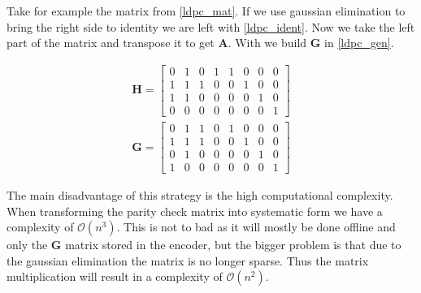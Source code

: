 Take for example the matrix from \cref{ldpc_mat}. If we use gaussian elimination to bring the right side to identity we are left with \cref{ldpc_ident}. Now we take the left part of the matrix and transpose it to get $\bm{A}$. With we build $\bm{G}$ in \cref{ldpc_gen}.

\begin{align}
	\bm{H} = \left[\begin{matrix}
		0 & 1 & 0 & 1 & 1 & 0 & 0 & 0 \\
		1 & 1 & 1 & 0 & 0 & 1 & 0 & 0 \\
		1 & 1 & 0 & 0 & 0 & 0 & 1 & 0 \\
		0 & 0 & 0 & 0 & 0 & 0 & 0 & 1
	\end{matrix} \right] \label{ldpc_ident} \\
	\bm{G} = \left[\begin{matrix}
		0 & 1 & 1 & 0 & 1 & 0 & 0 & 0 \\
 		1 & 1 & 1 & 0 & 0 & 1 & 0 & 0 \\
 		0 & 1 & 0 & 0 & 0 & 0 & 1 & 0 \\
 		1 & 0 & 0 & 0 & 0 & 0 & 0 & 1
	\end{matrix} \right] \label{ldpc_gen}
\end{align}

The main disadvantage of this strategy is the high computational complexity. When transforming the parity check matrix into systematic form we have a complexity of $\mathcal{O}(n^3)$. This is not to bad as it will mostly be done offline and only the $\bm{G}$ matrix stored in the encoder, but the bigger problem is that due to the gaussian elimination the matrix is no longer sparse. Thus the matrix multiplication will result in a complexity of $\mathcal{O}(n^2)$\cite{QiGo07}. 

